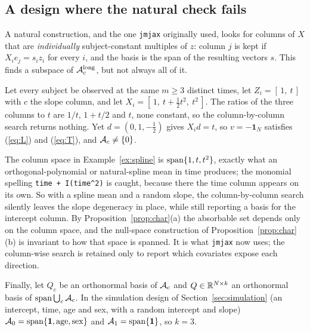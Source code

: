 \subsection{A design where the natural check fails}

A natural construction, and the one \texttt{jmjax} originally used, looks
for columns of $X$ that are \emph{individually} subject-constant multiples
of $z$: column $j$ is kept if $X_i e_j = s_i z_i$ for every $i$, and the
basis is the span of the resulting vectors $s$. This finds a subspace of
$\mathcal{A}_c^{\mathrm{long}}$, but not always all of it.

\begin{example}\label{ex:spline}
Let every subject be observed at the same $m \geq 3$ distinct times, let
$Z_i = [\,1,\ t\,]$ with $c$ the slope column, and let $X_i = [\,1,\ t +
\tfrac12 t^2,\ t^2\,]$. The ratios of the three columns to $t$ are $1/t$,
$1 + t/2$ and $t$, none constant, so the column-by-column search returns
nothing. Yet $d = (0, 1, -\tfrac12)$ gives $X_i d = t$, so $v =
-\mathbf{1}_N$ satisfies (\ref{eq:L}) and (\ref{eq:T}), and $\mathcal{A}_c
\neq \{0\}$.
\end{example}

The column space in Example~\ref{ex:spline} is $\operatorname{span}\{1, t, t^2\}$,
exactly what an orthogonal-polynomial or natural-spline mean in time
produces; the monomial spelling \texttt{time + I(time\^{}2)} is caught,
because there the time column appears on its own. So with a spline mean
and a random slope, the column-by-column search silently leaves the slope
degeneracy in place, while still reporting a basis for the intercept
column. By Proposition~\ref{prop:char}(a) the absorbable set depends only
on the column space, and the null-space construction of
Proposition~\ref{prop:char}(b) is invariant to how that space is spanned.
It is what \texttt{jmjax} now uses; the column-wise search is retained
only to report which covariates expose each direction.

Finally, let $Q_c$ be an orthonormal basis of $\mathcal{A}_c$ and $Q \in \mathbb{R}^{N
\times k}$ an orthonormal basis of $\operatorname{span}\bigcup_c \mathcal{A}_c$. In the simulation
design of Section~\ref{sec:simulation} (an intercept, time, age and sex,
with a random intercept and slope) $\mathcal{A}_0 = \operatorname{span}\{\mathbf{1}, \mathrm{age},
\mathrm{sex}\}$ and $\mathcal{A}_1 = \operatorname{span}\{\mathbf{1}\}$, so $k = 3$.
